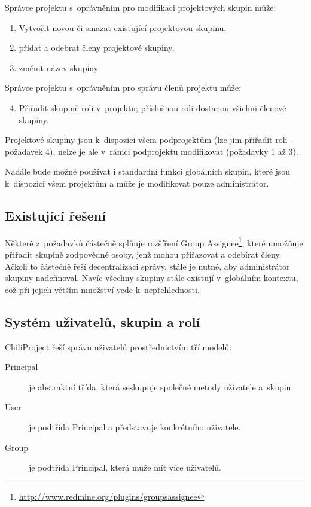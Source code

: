 \documentclass[thesis=B,czech]{FITthesis}[2012/05/02]
\begin{document}
Správce projektu s~oprávněním pro modifikaci projektových skupin může:

\begin{enumerate}[1.]
\item
  Vytvořit novou či smazat existující projektovou skupinu,
\item
  přidat a odebrat členy projektové skupiny,
\item
  změnit název skupiny
\end{enumerate}
Správce projektu s~oprávněním pro správu členů projektu může:

\begin{enumerate}[1.]
\setcounter{enumi}{3}
\item
  Přiřadit skupině roli v~projektu; příslušnou roli dostanou všichni
  členové skupiny.
\end{enumerate}
Projektové skupiny jsou k~dispozici všem podprojektům (lze jim přiřadit
roli -- požadavek 4), nelze je ale v~rámci podprojektu modifikovat
(požadavky 1 až 3).

Nadále bude možné používat i standardní funkci globálních skupin, které
jsou k~dispozici všem projektům a může je modifikovat pouze
administrátor.

\subsection{Existující řešení}

Některé z~požadavků částečně splňuje rozšíření Group Assignee\footnote{\url{http://www.redmine.org/plugins/groupsassignee}},
které umožňuje přiřadit skupině zodpovědné osoby, jenž mohou přiřazovat a
odebírat členy. Ačkoli to částečně řeší decentralizaci správy, stále je
nutné, aby administrátor skupiny nadefinoval. Navíc všechny skupiny stále
existují v~globálním kontextu, což při jejich větším množství vede
k~nepřehlednosti.

\subsection{Systém uživatelů, skupin a rolí}

\label{sec:proj_group_sys}

ChiliProject řeší správu uživatelů prostřednictvím tří modelů:

\begin{description}
\item[Principal] je abstraktní třída, která seskupuje společné metody
  uživatele \mbox{a skupin}.
\item[User] je podtřída Principal a představuje konkrétního
  uživatele.
\item[Group] je podtřída Principal, která může mít více uživatelů.
\end{description}
\end{document}
